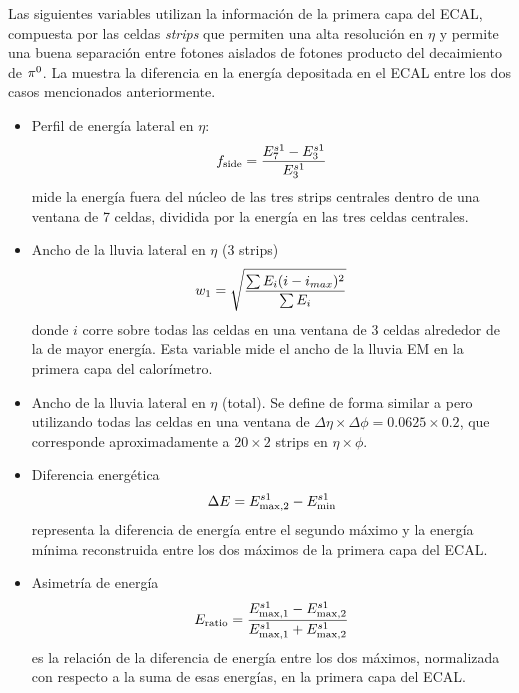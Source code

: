 Las siguientes variables utilizan la información de la primera capa del \ac{ECAL}, compuesta por las celdas \textit{strips} que permiten una alta resolución en \(\eta\) y permite una buena separación entre fotones aislados de fotones producto del decaimiento de \(\pi^{0}\). La \Fig{\ref{fig:pid_ss:ss:pizero}} muestra la diferencia en la energía depositada en el \ac{ECAL} entre los dos casos mencionados anteriormente.
\begin{itemize}
    \item Perfil de energía lateral en \(\eta\):
        \begin{equation}
            f_{\text{side}} = \frac{E_7^{s1} - E_3^{s1}}{E_3^{s1}}
        \end{equation}
        mide la energía fuera del núcleo de las tres strips centrales dentro de una ventana de 7 celdas, dividida por la energía en las tres celdas centrales.
    \item Ancho de la lluvia lateral en \(\eta\) (3 strips)
        \begin{equation}
            w_{1} = \sqrt{
                \frac{\sum E_i (i - i_{max})^2}{\sum E_i}
            }
        \end{equation}
        donde \(i\) corre sobre todas las celdas en una ventana de 3 celdas alrededor de la de mayor energía. Esta variable mide el ancho de la lluvia \ac{EM} en la primera capa del calorímetro.
    \item Ancho de la lluvia lateral en \(\eta\) (total).
        Se define de forma similar a \wone pero utilizando todas las celdas en una ventana de \(\Delta\eta\times\Delta\phi=0.0625\times 0.2\), que corresponde aproximadamente a \(20\times 2\) strips en \(\eta\times\phi\).
    \item Diferencia energética
        \begin{equation}
            \Delta E = E_{\text{max}, 2}^{s1} - E_{\text{min}}^{s1}
        \end{equation}
        representa la diferencia de energía entre el segundo máximo y la energía mínima reconstruida entre los dos máximos de la primera capa del \ac{ECAL}.
    \item Asimetría de energía
        \begin{equation}
            E_{\text{ratio}} = \frac{
                E_{\text{max}, 1}^{s1} - E_{\text{max}, 2}^{s1}
            }{
                E_{\text{max}, 1}^{s1} + E_{\text{max}, 2}^{s1}
            }
        \end{equation}
        es la relación de la diferencia de energía entre los dos máximos, normalizada con respecto a la suma de esas energías, en la primera capa del \ac{ECAL}.
\end{itemize}


